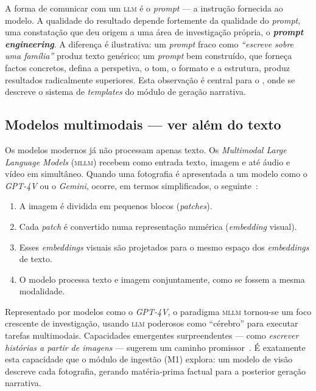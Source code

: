 A forma de comunicar com um \textsc{llm} é o \emph{prompt} — a instrução
fornecida ao modelo. A qualidade do resultado depende fortemente da
qualidade do \emph{prompt}, uma constatação que deu origem a uma área de
investigação própria, o \textbf{\emph{prompt engineering}}. A diferença é
ilustrativa: um \emph{prompt} fraco como \emph{``escreve sobre uma
família''} produz texto genérico; um \emph{prompt} bem construído, que
forneça factos concretos, defina a perspetiva, o tom, o formato e a
estrutura, produz resultados radicalmente superiores. Esta observação é
central para o , onde se descreve o sistema de
\emph{templates} do módulo de geração narrativa.

\subsection{Modelos multimodais — ver além do texto}
\label{sub:multimodal}

Os modelos modernos já não processam apenas texto. Os \emph{Multimodal
Large Language Models} (\textsc{mllm}) recebem como entrada texto, imagem
e até áudio e vídeo em simultâneo. Quando uma fotografia é apresentada a
um modelo como o \emph{GPT-4V} ou o \emph{Gemini}, ocorre, em termos
simplificados, o seguinte~\cite{yin2023mllmsurvey}:

\begin{enumerate}[leftmargin=*]
  \item A imagem é dividida em pequenos blocos (\emph{patches}).
  \item Cada \emph{patch} é convertido numa representação numérica
  (\emph{embedding} visual).
  \item Esses \emph{embeddings} visuais são projetados para o mesmo
  espaço dos \emph{embeddings} de texto.
  \item O modelo processa texto e imagem conjuntamente, como se fossem a
  mesma modalidade.
\end{enumerate}

Representado por modelos como o \emph{GPT-4V}, o paradigma \textsc{mllm}
tornou-se um foco crescente de investigação, usando \textsc{llm}
poderosos como ``cérebro'' para executar tarefas multimodais. Capacidades
emergentes surpreendentes — como \emph{escrever histórias a partir de
imagens} — sugerem um caminho promissor~\cite{yin2023mllmsurvey}. É
exatamente esta capacidade que o módulo de ingestão (M1) explora: um
modelo de visão descreve cada fotografia, gerando matéria-prima factual
para a posterior geração narrativa.

